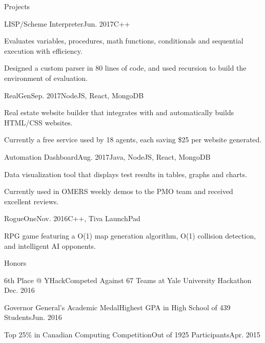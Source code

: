 \documentclass{resume} %
\begin{document}
\begin{rSection}{Projects}

\begin{projSec}{LISP/Scheme Interpreter}{Jun. 2017}{C++ \href{https://github.com/jsun98/SchemePlusPlus}{\space\faGithub}}
\item Evaluates variables, procedures, math functions, conditionals and sequential execution with efficiency.
\item Designed a custom parser in 80 lines of code, and used recursion to build the environment of evaluation.
\end{projSec}

\begin{projSec}{RealGen}{Sep. 2017}{NodeJS, React, MongoDB \href{https://github.com/jsun98/RealGen}{\space\faGithub}}
\item Real estate website builder that integrates with \href{http://www.mls.com/}{\color{gray}{MLS}} and automatically builds HTML/CSS websites.
\item Currently a free service used by 18 agents, each saving \$25 per website generated.
\end{projSec}

\begin{projSec}{Automation Dashboard}{Aug. 2017}{Java, NodeJS, React, MongoDB \href{https://github.com/AutoNinja/automation-dashboard}{\space\faGithub}}
\item Data visualization tool that displays test results in tables, graphs and charts.
\item Currently used in OMERS weekly demos to the PMO team and received excellent reviews.
\end{projSec}

\begin{projSec}{RogueOne}{Nov. 2016}{C++, Tiva LaunchPad \href{https://github.com/jsun98/RogueOne}{\space\faGithub}}
\item RPG game featuring a O(1) map generation algorithm, O(1) collision detection, and intelligent AI opponents.
\end{projSec}

\end{rSection}


\begin{rSection}{Honors}

\begin{honorSec}{6th Place @ YHack}{Competed Against 67 Teams at Yale University Hackathon \href{https://devpost.com/software/yhack_unity_zombies}{\space\small\faExternalLink}}{Dec. 2016}\end{honorSec}
\begin{honorSec}{Governor General's Academic Medal}{Highest GPA in High School of 439 Students}{Jun. 2016}\end{honorSec}
\begin{honorSec}{Top 25\% in Canadian Computing Competition}{Out of 1925 Participants}{Apr. 2015}\end{honorSec}
\vspace{1em} 

\end{rSection}
\end{document}
